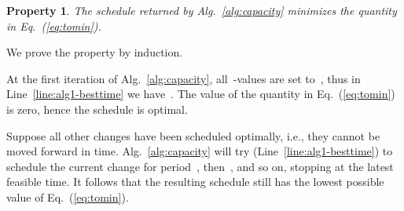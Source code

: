 \documentclass[10pt,journal,cspaper,compsoc]{IEEEtran}
\newcommand{\Eq}[1]{Eq.~(\ref{eq:#1})}
\newcommand{\Alg}[1]{Alg.~\ref{alg:#1}}
\newcommand{\Line}[1]{Line~\ref{line:#1}}
\newtheorem{property}{Property}
\begin{document}
\begin{property}
\label{prop:optimal}
The schedule returned by \Alg{capacity} minimizes the quantity in \Eq{tomin}.
\end{property}
\begin{IEEEproof}
We prove the property by induction.

At the first iteration of \Alg{capacity}, all~-values are set to~, thus in \Line{alg1-besttime}
we have~. The value of the quantity in \Eq{tomin} is zero, hence the schedule is optimal.

Suppose all other changes have been scheduled optimally, i.e., they cannot be moved forward in time. \Alg{capacity}
will try (\Line{alg1-besttime}) to schedule the current change for period~, then~, and so on,
stopping at the latest feasible time. It follows that the resulting schedule still has the lowest possible value of \Eq{tomin}.
\end{IEEEproof}
\end{document}
